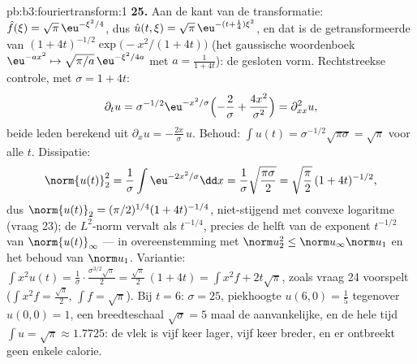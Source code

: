 \begin{solution}{pb:b3:fouriertransform:1}
\textbf{25.} Aan de kant van de transformatie: $\hat f(\xi) =
\sqrt\pi\,\eu^{-\xi^2/4}$, dus $\hat u(t,\xi) =
\sqrt\pi\,\eu^{-(t + \frac14)\xi^2}$, en dat is de
getransformeerde van $(1 + 4t)^{-1/2}\exp\bigl(-x^2/(1+4t)\bigr)$
(het gaussische woordenboek $\eu^{-ax^2} \mapsto
\sqrt{\pi/a}\,\eu^{-\xi^2/4a}$ met $a = \frac1{1+4t}$): de
gesloten vorm. Rechtstreekse controle, met $\sigma = 1 + 4t$:
\[
\partial_tu = \sigma^{-1/2}\eu^{-x^2/\sigma}
\Bigl(-\frac2\sigma + \frac{4x^2}{\sigma^2}\Bigr)
= \partial^2_{xx}u ,
\]
beide leden berekend uit $\partial_xu = -\frac{2x}\sigma\,u$.
Behoud: $\int u(t) = \sigma^{-1/2}\sqrt{\pi\sigma} = \sqrt\pi$
voor alle $t$. Dissipatie:
\[
\norm{u(t)}_2^2 = \frac1\sigma\int\eu^{-2x^2/\sigma}\dd x
= \frac1\sigma\sqrt{\frac{\pi\sigma}2}
= \sqrt{\frac\pi2}\,(1+4t)^{-1/2},
\]
dus $\norm{u(t)}_2 = (\pi/2)^{1/4}(1+4t)^{-1/4}$, niet-stijgend
met convexe logaritme (vraag 23); de $L^2$-norm vervalt als
$t^{-1/4}$, precies de helft van de exponent $t^{-1/2}$ van
$\norm{u(t)}_\infty$ --- in overeenstemming met $\norm u_2^2 \leq
\norm u_\infty\norm u_1$ en het behoud van $\norm u_1$.
Variantie: $\int x^2u(t) = \frac1\sigma\cdot
\frac{\sigma^{3/2}\sqrt\pi}2 = \frac{\sqrt\pi}2\,(1 + 4t) = \int
x^2f + 2t\sqrt\pi$, zoals vraag 24 voorspelt ($\int x^2f =
\frac{\sqrt\pi}2$, $\int f = \sqrt\pi$). Bij $t = 6$: $\sigma =
25$, piekhoogte $u(6, 0) = \frac15$ tegenover $u(0,0) = 1$, een
breedteschaal $\sqrt\sigma = 5$ maal de aanvankelijke, en de hele
tijd $\int u = \sqrt\pi \approx 1.7725$: de vlek is vijf keer
lager, vijf keer breder, en er ontbreekt geen enkele calorie.
\end{solution}

